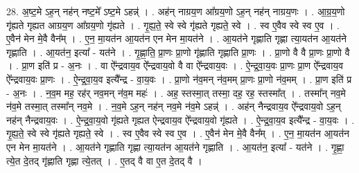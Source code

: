 \documentclass[17pt]{extarticle}
\begin{document}
28. अ॒ष्ट॒मे ऽह॒न् नह॑न् नष्ट॒मे᳚ ऽष्ट॒मे ऽहन्न्॑ । . अह॑न् नाग्रय॒ण आ᳚ग्रय॒णो ऽह॒न् नह॑न् नाग्रय॒णः । . आ॒ग्र॒य॒णो गृ॑ह्यते गृह्यत आग्रय॒ण आ᳚ग्रय॒णो गृ॑ह्यते । . गृ॒ह्य॒ते॒ स्वे स्वे गृ॑ह्यते गृह्यते॒ स्वे । . स्व ए॒वैव स्वे स्व ए॒व । . ए॒वैन॑ मेन मे॒वै वैन᳚म् । . ए॒न॒ मा॒यत॑न आ॒यत॑न एन मेन मा॒यत॑ने । . आ॒यत॑ने गृह्णाति गृह्णा त्या॒यत॑न आ॒यत॑ने गृह्णाति । . आ॒यत॑न॒ इत्या᳚ - यत॑ने । . गृ॒ह्णा॒ति॒ प्रा॒णः प्रा॒णो गृ॑ह्णाति गृह्णाति प्रा॒णः । . प्रा॒णो वै वै प्रा॒णः प्रा॒णो वै । . प्रा॒ण इति॑ प्र - अ॒नः । . वा ऐ᳚न्द्रवाय॒व ऐ᳚न्द्रवाय॒वो वै वा ऐ᳚न्द्रवाय॒वः । . ऐ॒न्द्र॒वा॒य॒वः प्रा॒णः प्रा॒ण ऐ᳚न्द्रवाय॒व ऐ᳚न्द्रवाय॒वः प्रा॒णः । . ऐ॒न्द्र॒वा॒य॒व इत्यै᳚न्द्र - वा॒य॒वः । . प्रा॒णो न॑व॒मन् न॑व॒मम् प्रा॒णः प्रा॒णो न॑व॒मम् । . प्रा॒ण इति॑ प्र - अ॒नः । . न॒व॒म मह॒ रह॑र् नव॒मन् न॑व॒म महः॑ । . अह॒ स्तस्मा॒त् तस्मा॒ दह॒ रह॒ स्तस्मा᳚त् । . तस्मा᳚न् नव॒मे न॑व॒मे तस्मा॒त् तस्मा᳚न् नव॒मे । . न॒व॒मे ऽह॒न् नह॑न् नव॒मे न॑व॒मे ऽहन्न्॑ । . अह॑न् नैन्द्रवाय॒व ऐ᳚न्द्रवाय॒वो ऽह॒न् नह॑न् नैन्द्रवाय॒वः । . ऐ॒न्द्र॒वा॒य॒वो गृ॑ह्यते गृह्यत ऐन्द्रवाय॒व ऐ᳚न्द्रवाय॒वो गृ॑ह्यते । . ऐ॒न्द्र॒वा॒य॒व इत्यै᳚न्द्र - वा॒य॒वः । . गृ॒ह्य॒ते॒ स्वे स्वे गृ॑ह्यते गृह्यते॒ स्वे । . स्व ए॒वैव स्वे स्व ए॒व । . ए॒वैन॑ मेन मे॒वै वैन᳚म् । . ए॒न॒ मा॒यत॑न आ॒यत॑न एन मेन मा॒यत॑ने । . आ॒यत॑ने गृह्णाति गृह्णा त्या॒यत॑न आ॒यत॑ने गृह्णाति । . आ॒यत॑न॒ इत्या᳚ - यत॑ने । . गृ॒ह्णा॒ त्ये॒त दे॒तद् गृ॑ह्णाति गृह्णा त्ये॒तत् । . ए॒तद् वै वा ए॒त दे॒तद् वै । \newline
\end{document}
